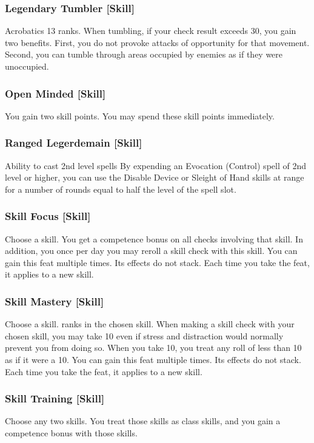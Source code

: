 \subsubsection{Legendary Tumbler [Skill]}
\featpre Acrobatics 13 ranks.
\featben When tumbling, if your check result exceeds 30, you gain two benefits. First, you do not provoke attacks of opportunity for that movement. Second, you can tumble through areas occupied by enemies as if they were unoccupied.

\subsubsection{Open Minded [Skill]}
 You gain two skill points. You may spend these skill points immediately.

\subsubsection{Ranged Legerdemain [Skill]}
 Ability to cast 2nd level spells
 By expending an Evocation (Control) spell of 2nd level or higher, you can use the Disable Device or Sleight of Hand skills at \rngclose range for a number of rounds equal to half the level of the spell slot.

\subsubsection{Skill Focus [Skill]}
Choose a skill.
 You get a  competence bonus on all checks involving that skill. In addition, you once per day you may reroll a skill check with this skill.
 You can gain this feat multiple times. Its effects do not stack. Each time you take the feat, it applies to a new skill.

\subsubsection{Skill Mastery [Skill]}
Choose a skill.
 ranks in the chosen skill.
\featben When making a skill check with your chosen skill, you may take 10 even if stress and distraction would normally prevent you from doing so. When you take 10, you treat any roll of less than 10 as if it were a 10.
 You can gain this feat multiple times. Its effects do not stack. Each time you take the feat, it applies to a new skill.

\subsubsection{Skill Training [Skill]}
\featben Choose any two skills. You treat those skills as class skills, and you gain a  competence bonus with those skills.

